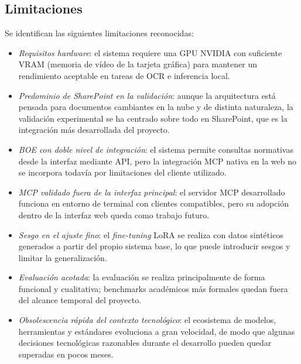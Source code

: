 \subsection{Limitaciones}

Se identifican las siguientes limitaciones reconocidas:

\begin{itemize}
    \item \textit{Requisitos hardware}: el sistema requiere una GPU NVIDIA con suficiente VRAM (memoria de vídeo de la tarjeta gráfica) para mantener un rendimiento aceptable en tareas de OCR e inferencia local.

    \item \textit{Predominio de SharePoint en la validación}: aunque la arquitectura está pensada para documentos cambiantes en la nube y de distinta naturaleza, la validación experimental se ha centrado sobre todo en SharePoint, que es la integración más desarrollada del proyecto.

    \item \textit{BOE con doble nivel de integración}: el sistema permite consultas normativas desde la interfaz mediante API, pero la integración MCP nativa en la web no se incorpora todavía por limitaciones del cliente utilizado.

    \item \textit{MCP validado fuera de la interfaz principal}: el servidor MCP desarrollado funciona en entorno de terminal con clientes compatibles, pero su adopción dentro de la interfaz web queda como trabajo futuro.

    \item \textit{Sesgo en el ajuste fino}: el \textit{fine-tuning} LoRA se realiza con datos sintéticos generados a partir del propio sistema base, lo que puede introducir sesgos y limitar la generalización.

    \item \textit{Evaluación acotada}: la evaluación se realiza principalmente de forma funcional y cualitativa; benchmarks académicos más formales quedan fuera del alcance temporal del proyecto.

    \item \textit{Obsolescencia rápida del contexto tecnológico}: el ecosistema de modelos, herramientas y estándares evoluciona a gran velocidad, de modo que algunas decisiones tecnológicas razonables durante el desarrollo pueden quedar superadas en pocos meses.
\end{itemize}

